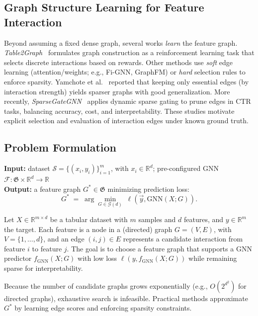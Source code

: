 \documentclass[10pt,a4paper]{article}
\begin{document}
\subsection{Graph Structure Learning for Feature Interaction}
Beyond assuming a fixed dense graph, several works \emph{learn} the feature graph. \emph{Table2Graph}~\cite{Table2Graph} formulates graph construction as a reinforcement learning task that selects discrete interactions based on rewards. Other methods use \emph{soft} edge learning (attention/weights; e.g., Fi-GNN, GraphFM) or \emph{hard} selection rules to enforce sparsity. Yamchote et al.~\cite{Yamchote2025FromFT} reported that keeping only essential edges (by interaction strength) yields sparser graphs with good generalization. More recently, \emph{SparseGateGNN}~\cite{nay2025sparsegategnn} applies dynamic sparse gating to prune edges in CTR tasks, balancing accuracy, cost, and interpretability. These studies motivate explicit selection and evaluation of interaction edges under known ground truth.

\subsection{Problem Formulation}
\begin{algorithm}[h]
  \caption{Interaction Graph Structure Problem}\label{problem:interactionGraph}
  \textbf{Input:} dataset $\mathcal{S}=\{(x_i,y_i)\}_{i=1}^m$, with $x_i\in\mathbb{R}^d$; pre-configured GNN $\mathcal{F}:\mathfrak{G}\times\mathbb{R}^d\to\mathbb{R}$\\
  \textbf{Output:} a feature graph $G^*\in\mathfrak{G}$ minimizing prediction loss:
  $$
  G^* \;=\; \arg\min_{G \in \mathcal{G}(d)} \; \ell(\vec{y}, \mathrm{GNN}(X; G)).
  $$
\end{algorithm}
Let $X \in \mathbb{R}^{m \times d}$ be a tabular dataset with $m$ samples and $d$ features, and $y \in \mathbb{R}^m$ the target. Each feature is a node in a (directed) graph $G=(V,E)$, with $V=\{1,\ldots,d\}$, and an edge $(i,j)\in E$ represents a candidate interaction from feature $i$ to feature $j$. The goal is to choose a feature graph that supports a GNN predictor $f_{\mathrm{GNN}}(X;G)$ with low loss $\ell(y,f_{\mathrm{GNN}}(X;G))$ while remaining sparse for interpretability.

Because the number of candidate graphs grows exponentially (e.g., $O(2^{d^2})$ for directed graphs), exhaustive search is infeasible. Practical methods approximate $G^*$ by learning edge scores and enforcing sparsity constraints.
\end{document}
